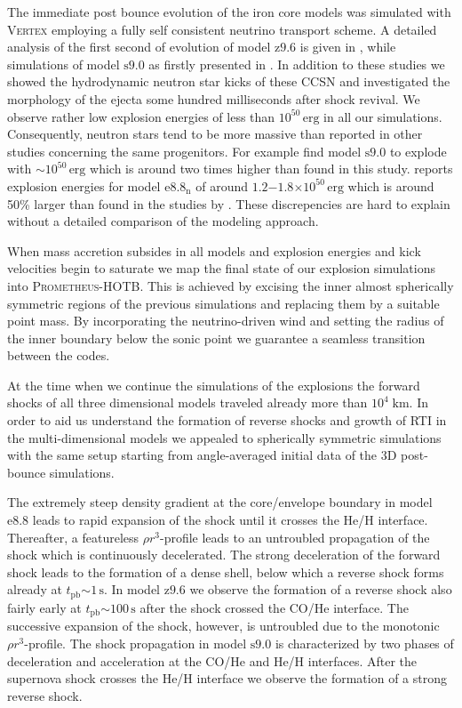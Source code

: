 \documentclass[fleqn,usenatbib]{mnras}
\newcommand{\tpb}{\ensuremath{t_{\text{pb}}}}
\newcommand{\erg}{\ensuremath{\mathrm{erg}}}
\newcommand{\s}{\ensuremath{\text{s}}}
\newcommand{\prom}{\textsc{Prometheus-HOTB}\xspace}
\newcommand{\vertex}{\textsc{Vertex}\xspace}
\newcommand{\onemg}{\ensuremath{\mathrm{e8.8}}\xspace}
\newcommand{\snine}{\ensuremath{\mathrm{s9.0}}\xspace}
\newcommand{\znine}{\ensuremath{\mathrm{z9.6}}\xspace}
\begin{document}
The immediate post bounce evolution of the iron core models was 
simulated with \vertex employing a fully self consistent neutrino 
transport scheme. A detailed analysis of the first second of 
evolution of model \znine is given in \citet{Melson2015a}, 
while simulations of model \snine as firstly presented in \citet{Melson2019}. 
In addition to these studies we showed the 
hydrodynamic neutron star kicks of these 
CCSN and investigated the morphology of the ejecta some 
hundred milliseconds after shock revival. 
We observe rather low explosion energies of less than $10^{50}\,\erg$
in all our simulations. Consequently, neutron stars tend to be
more massive than reported in other studies concerning the same
progenitors.
For example \cite{Burrows2019} find model \snine to explode with 
$\mathord{\sim} 10^{50}\,\erg$ which is around two times higher than found
in this study. 
\cite{Radice2017} reports explosion energies for model $\mathrm{e8.8_n}$ 
of around $1.2\mathord{-}1.8 \mathord{\times} 10^{50}\,\erg$ which is 
around 50\% larger than found in the studies by \cite{Kitaura2006,Huedepohl2009,Groote2014}.
These discrepencies are hard to explain without a detailed
comparison of the modeling approach. 

When mass accretion subsides in all models and 
explosion energies and kick velocities begin to saturate 
we map the final state of our explosion simulations into \prom. 
This is achieved by excising the inner almost spherically symmetric 
regions of the previous simulations and replacing them by a 
suitable point mass. By incorporating the neutrino-driven wind
and setting the radius of the inner boundary below the sonic 
point we guarantee a seamless transition between the codes.

At the time when we continue the simulations of the explosions 
the forward shocks of all three dimensional models traveled 
already more than $10^4\;\mathrm{km}$. 
In order to aid us understand the formation of reverse shocks and
growth of RTI in the multi-dimensional models we appealed to spherically
symmetric simulations with the same setup starting from angle-averaged initial data
of the 3D post-bounce simulations.

The extremely steep density gradient at the core/envelope boundary
in model \onemg leads to rapid expansion 
of the shock until it crosses the He/H interface.
Thereafter, a featureless $\rho r^3$-profile leads to an untroubled 
propagation of the shock which is continuously decelerated.
The strong deceleration of the forward shock leads to the formation of a 
dense shell, below which a reverse shock forms already at $\tpb\mathord{\sim}1\,\s$.
In model \znine we observe the formation of a reverse shock also fairly early at
$\tpb\mathord{\sim}100\,\s$ after the shock crossed the CO/He interface.
The successive expansion of the shock, however, is untroubled due to the 
monotonic $\rho r^3$-profile.
The shock propagation in model \snine is characterized by two phases of
deceleration and acceleration at the CO/He and He/H interfaces.
After the supernova shock crosses the He/H interface we observe the
formation of a strong reverse shock.
\end{document}
